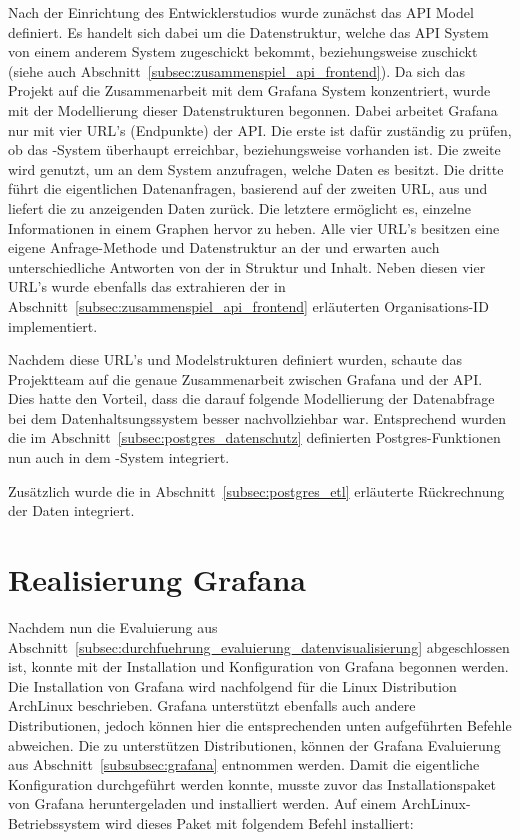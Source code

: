 {Nach der Einrichtung des Entwicklerstudios wurde zunächst das API Model
definiert. Es handelt sich dabei um die Datenstruktur, welche das API System
von einem anderem System zugeschickt bekommt, beziehungsweise zuschickt
(siehe auch Abschnitt~\ref{subsec:zusammenspiel_api_frontend}). Da
sich das Projekt auf die Zusammenarbeit mit dem Grafana System konzentriert,
wurde mit der Modellierung dieser Datenstrukturen begonnen. Dabei arbeitet
Grafana nur mit vier URL's (Endpunkte) der API\@. Die erste ist dafür zuständig
zu prüfen, ob das \hyp{}System überhaupt erreichbar, beziehungsweise
vorhanden ist. Die zweite wird genutzt, um an dem  System anzufragen,
welche Daten es besitzt. Die dritte führt die eigentlichen Datenanfragen,
basierend auf der zweiten URL, aus und liefert die zu anzeigenden Daten zurück.
Die letztere ermöglicht es, einzelne Informationen in einem Graphen hervor zu
heben. Alle vier URL's besitzen eine eigene Anfrage\hyp{}Methode und
Datenstruktur an der  und erwarten auch unterschiedliche Antworten von
der  in Struktur und Inhalt. Neben diesen vier URL's wurde ebenfalls
das extrahieren der in Abschnitt~\ref{subsec:zusammenspiel_api_frontend}
erläuterten Organisations\hyp{}ID implementiert.

Nachdem diese URL's und Modelstrukturen definiert wurden, schaute das
Projektteam auf die genaue Zusammenarbeit zwischen Grafana und der API\@. Dies
hatte den Vorteil, dass die darauf folgende Modellierung der Datenabfrage bei
dem Datenhaltsungssystem besser nachvollziehbar war. Entsprechend wurden die im
Abschnitt~\ref{subsec:postgres_datenschutz} definierten Postgres-Funktionen nun
auch in dem \hyp{}System integriert.

Zusätzlich wurde die in Abschnitt~\ref{subsec:postgres_etl} erläuterte
Rückrechnung der Daten integriert.
\nl%

\section{Realisierung Grafana}
\label{sec:realisierung_grafana}
Nachdem nun die Evaluierung aus
Abschnitt~\ref{subsec:durchfuehrung_evaluierung_datenvisualisierung}
abgeschlossen ist, konnte mit der Installation und Konfiguration von Grafana
begonnen werden. Die Installation von Grafana wird nachfolgend für die Linux
Distribution ArchLinux beschrieben. Grafana unterstützt ebenfalls auch andere
Distributionen, jedoch können hier die entsprechenden unten aufgeführten
Befehle abweichen. Die zu unterstützen Distributionen, können der Grafana
Evaluierung aus Abschnitt~\ref{subsubsec:grafana} entnommen werden.  Damit die
eigentliche Konfiguration durchgeführt werden konnte, musste zuvor das
Installationspaket von Grafana heruntergeladen und installiert werden. Auf
einem ArchLinux\hyp{}Betriebssystem wird dieses Paket mit folgendem Befehl
installiert:

}

